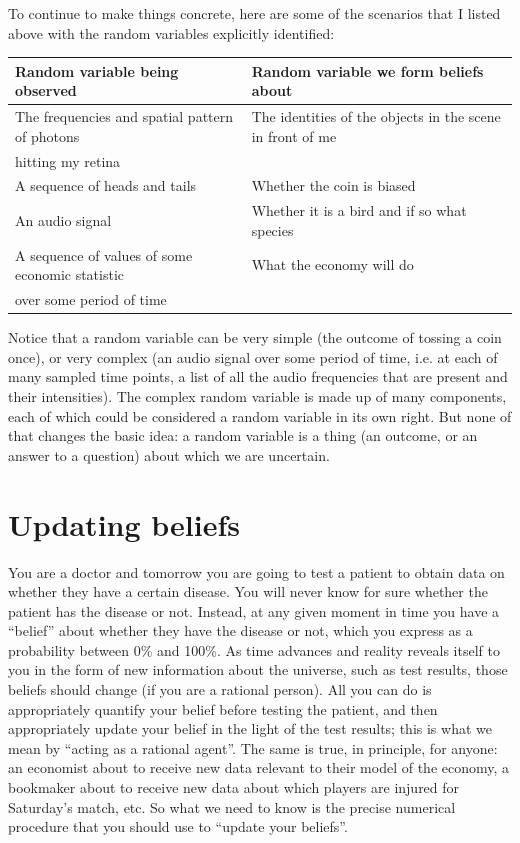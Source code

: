 To continue to make things concrete, here are some of the scenarios that I listed above with the random variables explicitly identified:

\begin{table}[h!]
  \centering
  \begin{tabular}{|l|l|}
    \hline
    {\bf Random variable being observed} & {\bf Random variable we form beliefs about} \\
    \hline
    The frequencies and spatial pattern of photons  & The identities of the objects in the scene in front of me \\
    hitting my retina & \\
    \hline
    A sequence of heads and tails  & Whether the coin is biased \\
    \hline
    An audio signal                    & Whether it is a bird and if so what species \\
    \hline
    A sequence of values of some economic statistic & What the economy will do \\
    over some period of time   & \\
    \hline
  \end{tabular}
\end{table}

Notice that a random variable can be very simple (the outcome of tossing a coin once), or very complex (an audio signal over some period of time, i.e. at each of many sampled time points, a list of all the audio frequencies that are present and their intensities). The complex random variable is made up of many components, each of which could be considered a random variable in its own right. But none of that changes the basic idea: a random variable is a thing (an outcome, or an answer to a question) about which we are uncertain.


\newpage




\section{Updating beliefs}

You are a doctor and tomorrow you are going to test a patient to obtain data on whether they have a certain
disease. You will never know for sure whether the patient has the disease or not. Instead, at any given moment
in time you have a ``belief​'' about whether they have the disease or not, which you express as a probability
between 0\% and 100\%. As time advances and reality reveals itself to you in the form of new information about
the universe, such as test results, those beliefs should change (if you are a rational person). All you can do
is appropriately quantify your belief before testing the patient, and then appropriately update your belief in
the light of the test results; this is what we mean by ``acting as a rational agent​''. The same is true, in
principle, for anyone: an economist about to receive new data relevant to their model of the economy, a
bookmaker about to receive new data about which players are injured for Saturday's match, etc. So what we need
to know is the precise numerical procedure that you should use to ``update your beliefs​''.

